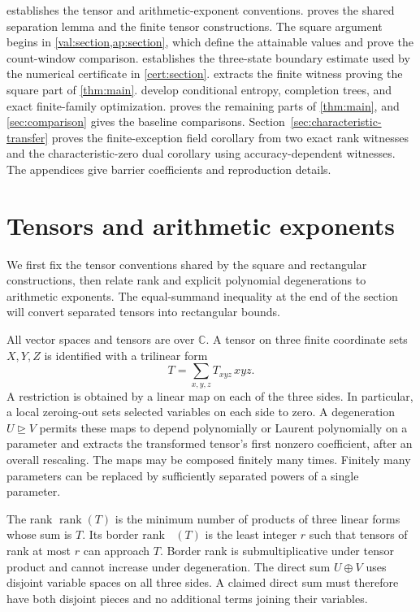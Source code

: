 \documentclass[11pt]{article}
\numberwithin{equation}{section}
\theoremstyle{definition}
\theoremstyle{remark}
\newcommand{\C}{\mathbb C}
\DeclareMathOperator{\rank}{rank}
\DeclareMathOperator{\brank}{\underline R}
\begin{document}
 establishes the tensor and arithmetic-exponent
conventions.   proves the shared separation lemma
and the finite tensor constructions.  The square argument begins in
\cref{val:section,ap:section}, which define the attainable values and
prove the count-window comparison.
 establishes the three-state boundary
estimate used by the numerical certificate in \cref{cert:section}.
 extracts the finite
witness proving the square part of \cref{thm:main}.
 develop conditional
entropy, completion trees, and exact finite-family optimization.
 proves the remaining parts of
\cref{thm:main}, and \cref{sec:comparison} gives the baseline
comparisons.  Section~\ref{sec:characteristic-transfer} proves the
finite-exception field corollary from two exact rank witnesses and
the characteristic-zero dual corollary using accuracy-dependent witnesses.
The appendices give barrier coefficients and reproduction details.

\section{Tensors and arithmetic exponents}\label{sec:preliminaries}

We first fix the tensor conventions shared by the square and rectangular
constructions, then relate rank and explicit polynomial degenerations to
arithmetic exponents.  The equal-summand inequality at the end of the
section will convert separated tensors into rectangular bounds.

All vector spaces and tensors are over \(\C\).  A tensor on three finite
coordinate sets \(X,Y,Z\) is identified with a trilinear form
\[
 T=\sum_{x,y,z}T_{xyz}\,x y z.
\]
A restriction is obtained by a linear map on each of the three sides.
In particular, a local zeroing-out sets selected variables on each side
to zero.  A degeneration \(U\unrhd V\) permits these maps to depend
polynomially or Laurent polynomially on a parameter and extracts the
transformed tensor's first nonzero coefficient, after an overall rescaling.
The maps may be composed finitely many times.
Finitely many parameters can be replaced by sufficiently separated powers
of a single parameter.

The rank \(\rank(T)\) is the minimum number of products of three linear
forms whose sum is \(T\).  Its border rank \(\brank(T)\) is the least
integer \(r\) such that tensors of rank at most \(r\) can approach
\(T\).  Border rank is submultiplicative under tensor product and cannot
increase under degeneration.  The direct sum \(U\oplus V\) uses
disjoint variable spaces on all three sides.  A claimed direct sum must
therefore have both disjoint pieces and no additional terms joining their
variables.
\end{document}
